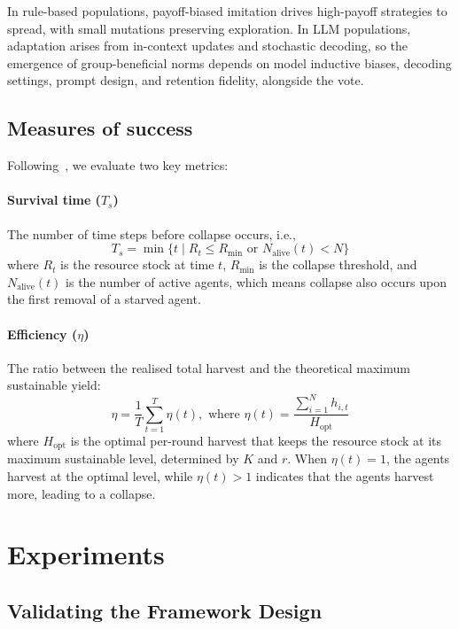 \documentclass[sigconf]{aamas}
\begin{document}
In rule-based populations, payoff-biased imitation drives high-payoff strategies to spread, with small mutations preserving exploration. 
In LLM populations, adaptation arises from in-context updates and stochastic decoding, so the emergence of group-beneficial norms depends on model inductive biases, decoding settings, prompt design, and retention fidelity, alongside the vote.

\subsection{Measures of success}

Following~\citet{piatti2024govsim}, we evaluate two key metrics:

\paragraph{Survival time ($T_s$)}  
The number of time steps before collapse occurs, i.e.,
$$
T_s = \min \{ t \mid R_t \leq R_{\min} \,\, \text{or} \,\, N_{\text{alive}}(t) < N \}
$$
where $R_t$ is the resource stock at time $t$, $R_{\min}$ is the collapse threshold, and $N_{\text{alive}}(t)$ is the number of active agents, which means collapse also occurs upon the first removal of a starved agent.

\paragraph{Efficiency ($\eta$)}  
The ratio between the realised total harvest and the theoretical maximum sustainable yield:
$$
\eta = \frac{1}{T} \sum_{t=1}^T \eta \left(t\right), \,\, \text{where} \,\, 
\eta \left(t\right) = \frac{\sum_{i=1}^N h_{i,t}}{H_{\text{opt}}}
$$
where $H_{\text{opt}}$ is the optimal per-round harvest that keeps the resource stock at its maximum sustainable level, determined by $K$ and $r$.
When $\eta \left(t\right) = 1$, the agents harvest at the optimal level, while $\eta \left(t\right) > 1$ indicates that the agents harvest more, leading to a collapse.

\section{Experiments}

\subsection{Validating the Framework Design}
\end{document}
